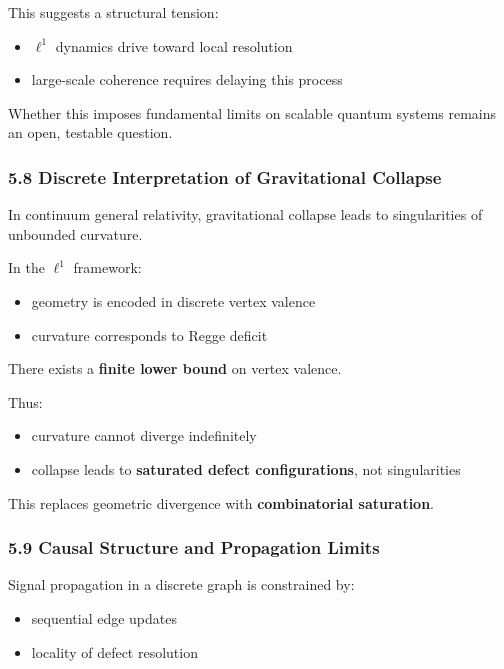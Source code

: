 \documentclass[
]{article}
\providecommand{\tightlist}{%
  \setlength{\itemsep}{0pt}\setlength{\parskip}{0pt}}
\begin{document}
This suggests a structural tension:

\begin{itemize}
\tightlist
\item
  \(\ell^1\) dynamics drive toward local resolution
\item
  large-scale coherence requires delaying this process
\end{itemize}

Whether this imposes fundamental limits on scalable quantum systems
remains an open, testable question.

\subsubsection{5.8 Discrete Interpretation of Gravitational
Collapse}\label{discrete-interpretation-of-gravitational-collapse}

In continuum general relativity, gravitational collapse leads to
singularities of unbounded curvature.

In the \(\ell^1\) framework:

\begin{itemize}
\tightlist
\item
  geometry is encoded in discrete vertex valence
\item
  curvature corresponds to Regge deficit
\end{itemize}

There exists a \textbf{finite lower bound} on vertex valence.

Thus:

\begin{itemize}
\tightlist
\item
  curvature cannot diverge indefinitely
\item
  collapse leads to \textbf{saturated defect configurations}, not
  singularities
\end{itemize}

This replaces geometric divergence with \textbf{combinatorial
saturation}.

\subsubsection{5.9 Causal Structure and Propagation
Limits}\label{causal-structure-and-propagation-limits}

Signal propagation in a discrete graph is constrained by:

\begin{itemize}
\tightlist
\item
  sequential edge updates
\item
  locality of defect resolution
\end{itemize}
\end{document}
